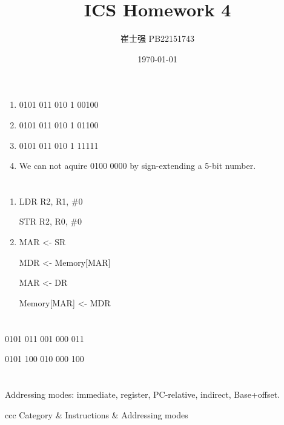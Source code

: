 \documentclass[UTF8]{ctexart}
\title{ICS Homework 4}
\author{崔士强 PB22151743}
\date{\today}
\begin{document}
\maketitle
\section{}  %
\begin{enumerate}
  \item 0101 011 010 1 00100
  \item 0101 011 010 1 01100
  \item 0101 011 010 1 11111
  \item We can not aquire 0100 0000 by sign-extending a 5-bit number.
\end{enumerate}
\section{} %
\section{} %
\begin{enumerate}
  \item LDR R2, R1, \#0
  
        STR R2, R0, \#0
  \item MAR <- SR
  
        MDR <- Memory[MAR]
        
        MAR <- DR

        Memory[MAR] <- MDR
\end{enumerate}
\section{} %
0101 011 001 000 011

0101 100 010 000 100
\section{} %
Addressing modes: immediate, register, PC-relative, indirect, Base+offset.
\begin{tabular}[H]
  \centering
  \begin{table}{ccc}
    \hline\hline
    Category & Instructions & Addressing modes \\
  \end{table}
\end{tabular}
\end{document}
